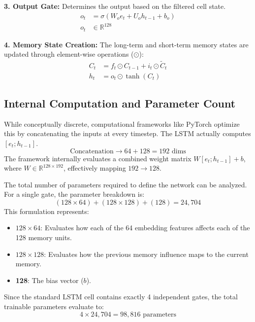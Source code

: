 \documentclass[12pt, a4paper, twocolumn]{article}
\begin{document}
\textbf{3. Output Gate:}
Determines the output based on the filtered cell state.
\begin{align}
    o_t &= \sigma(W_o e_t + U_o h_{t-1} + b_o) \\
    o_t &\in \mathbb{R}^{128} \nonumber
\end{align}

\textbf{4. Memory State Creation:}
The long-term and short-term memory states are updated through element-wise operations ($\odot$):
\begin{align}
    C_t &= f_t \odot C_{t-1} + i_t \odot \tilde{C}_t \\
    h_t &= o_t \odot \tanh(C_t)
\end{align}

\subsection{\textbf{Internal Computation and Parameter Count}}
While conceptually discrete, computational frameworks like PyTorch optimize this by concatenating the inputs at every timestep. The LSTM actually computes $[e_t ; h_{t-1}]$.
\begin{equation}
    \text{Concatenation} \rightarrow 64 + 128 = 192 \text{ dims}
\end{equation}
The framework internally evaluates a combined weight matrix $W [e_t ; h_{t-1}] + b$, where $W \in \mathbb{R}^{128 \times 192}$, effectively mapping $192 \rightarrow 128$.

The total number of parameters required to define the network can be analyzed. For a single gate, the parameter breakdown is:
\begin{equation}
    (128 \times 64) + (128 \times 128) + (128) = 24,704
\end{equation}
This formulation represents:
\begin{itemize}
    \item \textbf{$128 \times 64$}: Evaluates how each of the 64 embedding features affects each of the 128 memory units.
    \item \textbf{$128 \times 128$}: Evaluates how the previous memory influence maps to the current memory.
    \item \textbf{128}: The bias vector ($b$).
\end{itemize}
Since the standard LSTM cell contains exactly 4 independent gates, the total trainable parameters evaluate to:
\begin{equation}
    4 \times 24,704 = 98,816 \text{ parameters}
\end{equation}
\end{document}
